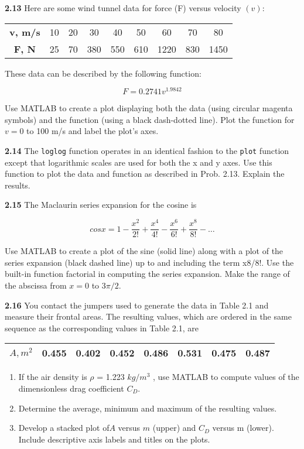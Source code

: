 \documentclass[../main.tex]{subfiles}
\begin{document}
\begin{multicols}{2}
\textbf{2.13} Here are some wind tunnel data for force (F) versus
velocity $(v)$:

\begin{tabular}{ccccccccc}
	\hline
	\textbf{v, m/s} &10& 20& 30 &40& 50 &60 &70 &80	\\
	\textbf{F, N} &25 &70 &380 &550 &610 &1220 &830 &1450\\
	\hline
	
\end{tabular}


These data can be described by the following function:


$$F=0.2741v^{1.9842} $$

Use MATLAB to create a plot displaying both the data (using
circular magenta symbols) and the function (using a black
dash-dotted line). Plot the function for $v = 0$ to 100 m/s and
label the plot's axes.


\textbf{2.14} The \texttt{loglog} function operates in an identical fashion
to the \texttt{plot} function except that logarithmic scales are used
for both the x and y axes. Use this function to plot the data
and function as described in Prob. 2.13. Explain the results.



\textbf{2.15} The Maclaurin series expansion for the cosine is

$$cosx = 1 - \dfrac{x^2}{2!}+ \dfrac{x^4}{4!}- \dfrac{x^6}{6!}+ \dfrac{x^8}{8!}- \ldots $$


Use MATLAB to create a plot of the sine (solid line) along
with a plot of the series expansion (black dashed line) up
to and including the term x8/8!. Use the built-in function
factorial in computing the series expansion. Make the
range of the abscissa from $x = 0$ to $3\pi /2$.


\textbf{2.16} You contact the jumpers used to generate the data in
Table 2.1 and measure their frontal areas. The resulting
values, which are ordered in the same sequence as the
corresponding values in Table 2.1, are
	\begin{tabular}{cccccccc}
		\hline
		\textbf{$A, m^2$} &0.455 &0.402 &0.452& 0.486 &0.531 &0.475 &0.487\\
		\hline
		
	\end{tabular}


\begin{enumerate}[label=(\alph*)]
	\item If the air density is $\rho$ = 1.223 $kg/m^3$
	, use MATLAB to
	compute values of the dimensionless drag coefficient $C_D$.
	\item Determine the average, minimum and maximum of the
	resulting values.
	\item Develop a stacked plot of$ A$ versus $m$ (upper) and $C_D$
	versus m (lower). Include descriptive axis labels and
	titles on the plots.
\end{enumerate}



\end{multicols}
\end{document}

